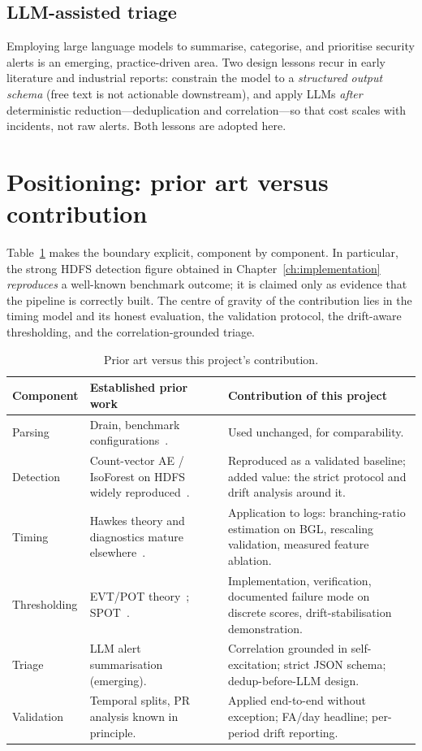 \documentclass[11pt,a4paper]{report}
\begin{document}
\subsection{LLM-assisted triage}
Employing large language models to summarise, categorise, and prioritise
security alerts is an emerging, practice-driven area. Two design lessons
recur in early literature and industrial reports: constrain the model to a
\emph{structured output schema} (free text is not actionable downstream),
and apply LLMs \emph{after} deterministic reduction---deduplication and
correlation---so that cost scales with incidents, not raw alerts. Both
lessons are adopted here.

\section{Positioning: prior art versus contribution}
\label{sec:positioning}
Table~\ref{tab:priorwork} makes the boundary explicit, component by
component. In particular, the strong HDFS detection figure obtained in
Chapter~\ref{ch:implementation} \emph{reproduces} a well-known benchmark
outcome; it is claimed only as evidence that the pipeline is correctly
built. The centre of gravity of the contribution lies in the timing model
and its honest evaluation, the validation protocol, the drift-aware
thresholding, and the correlation-grounded triage.

\begin{table}[H]
\centering
\caption{Prior art versus this project's contribution.}
\label{tab:priorwork}
\small
\renewcommand{\arraystretch}{1.25}
\begin{tabular}{@{}p{2.5cm} p{5.6cm} p{5.8cm}@{}}
\toprule
\textbf{Component} & \textbf{Established prior work} & \textbf{\color{good}Contribution of this project} \\
\midrule
Parsing & Drain, benchmark configurations~\cite{drain,loghub}. & Used unchanged, for comparability. \\
Detection & Count-vector AE / IsoForest on HDFS widely reproduced~\cite{loglizer,deeplog}. & Reproduced as a validated baseline; added value: the strict protocol and drift analysis around it. \\
Timing & Hawkes theory and diagnostics mature elsewhere~\cite{hawkes,timerescaling,daley}. & Application to logs: branching-ratio estimation on BGL, rescaling validation, measured feature ablation. \\
Thresholding & EVT/POT theory~\cite{pickands,coles}; SPOT~\cite{spot}. & Implementation, verification, documented failure mode on discrete scores, drift-stabilisation demonstration. \\
Triage & LLM alert summarisation (emerging). & Correlation grounded in self-excitation; strict JSON schema; dedup-before-LLM design. \\
Validation & Temporal splits, PR analysis known in principle. & Applied end-to-end without exception; FA/day headline; per-period drift reporting. \\
\bottomrule
\end{tabular}
\end{table}
\end{document}
